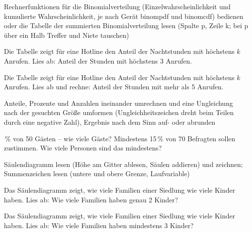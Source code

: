 \begin{aufgabe}{Rechnerfunktionen für die Binomialverteilung (Einzelwahrscheinlichkeit und kumulierte Wahrscheinlichkeit, je nach Gerät binompdf und binomcdf) bedienen oder die Tabelle der summierten Binomialverteilung lesen (Spalte p, Zeile k; bei p über ein Halb Treffer und Niete tauschen)}
\begin{teile}
\teil Die Tabelle zeigt für eine Hotline den Anteil der Nachtstunden mit höchstens $k$ Anrufen. Lies ab: Anteil der Stunden mit höchstens 3 Anrufen.

\leerfeld
\teil Die Tabelle zeigt für eine Hotline den Anteil der Nachtstunden mit höchstens $k$ Anrufen. Lies ab und rechne: Anteil der Stunden mit mehr als 5 Anrufen.

\leerfeld
\end{teile}
\end{aufgabe}

\begin{aufgabe}{Anteile, Prozente und Anzahlen ineinander umrechnen und eine Ungleichung nach der gesuchten Größe umformen (Ungleichheitszeichen dreht beim Teilen durch eine negative Zahl), Ergebnis nach dem Sinn auf- oder abrunden}
\begin{teile}
\,\% von 50 Gästen – wie viele Gäste? \leerfeld
\teil Mindestens 15\,\% von 70 Befragten sollen zustimmen. Wie viele Personen sind das mindestens? \leerfeld
\end{teile}
\end{aufgabe}

\begin{aufgabe}{Säulendiagramm lesen (Höhe am Gitter ablesen, Säulen addieren) und zeichnen; Summenzeichen lesen (untere und obere Grenze, Laufvariable)}
\begin{teile}
\teil Das Säulendiagramm zeigt, wie viele Familien einer Siedlung wie viele Kinder haben. Lies ab: Wie viele Familien haben genau 2 Kinder?

\leerfeld
\teil Das Säulendiagramm zeigt, wie viele Familien einer Siedlung wie viele Kinder haben. Lies ab: Wie viele Familien haben mindestens 3 Kinder?

\leerfeld
\end{teile}
\end{aufgabe}

